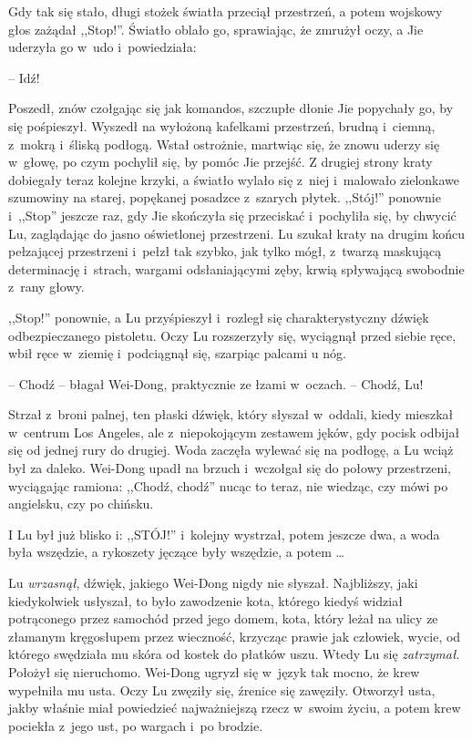 \documentclass[oneside,polish,11pt,rmheadings]{mwbk}
\begin{document}
Gdy tak się stało, długi stożek światła przeciął przestrzeń, a potem wojskowy głos zażądał ,,Stop!''. Światło oblało go, sprawiając, że zmrużył oczy, a Jie uderzyła go w~udo i~powiedziała: 

-- Idź!

Poszedł, znów czołgając się jak komandos, szczupłe dłonie Jie popychały go, by się pośpieszył. Wyszedł na wyłożoną kafelkami przestrzeń, brudną i~ciemną, z~mokrą i~śliską podłogą. Wstał ostrożnie, martwiąc się, że znowu uderzy się w~głowę, po czym pochylił się, by pomóc Jie przejść. Z drugiej strony kraty dobiegały teraz kolejne krzyki, a światło wylało się z~niej i~malowało zielonkawe szumowiny na starej, popękanej posadzce z~szarych płytek. ,,Stój!'' ponownie i~,,Stop'' jeszcze raz, gdy Jie skończyła się przeciskać i~pochyliła się, by chwycić Lu, zaglądając do jasno oświetlonej przestrzeni. Lu szukał kraty na drugim końcu pełzającej przestrzeni i~pełzł tak szybko, jak tylko mógł, z~twarzą maskującą determinację i~strach, wargami odsłaniającymi zęby, krwią spływającą swobodnie z~rany głowy.

,,Stop!'' ponownie, a Lu przyśpieszył i~rozległ się charakterystyczny dźwięk odbezpieczanego pistoletu. Oczy Lu rozszerzyły się, wyciągnął przed siebie ręce, wbił ręce w~ziemię i~podciągnął się, szarpiąc palcami u nóg.

-- Chodź -- błagał Wei-Dong, praktycznie ze łzami w~oczach. -- Chodź, Lu! 

Strzał z~broni palnej, ten płaski dźwięk, który słyszał w~oddali, kiedy mieszkał w~centrum Los Angeles, ale z~niepokojącym zestawem jęków, gdy pocisk odbijał się od jednej rury do drugiej. Woda zaczęła wylewać się na podłogę, a Lu wciąż był za daleko. Wei-Dong upadł na brzuch i~wczołgał się do połowy przestrzeni, wyciągając ramiona: ,,Chodź, chodź'' nucąc to teraz, nie wiedząc, czy mówi po angielsku, czy po chińsku.

I Lu był już blisko i: ,,STÓJ!'' i~kolejny wystrzał, potem jeszcze dwa, a woda była wszędzie, a rykoszety jęczące były wszędzie, a potem \ldots 

Lu \textit{wrzasnął}, dźwięk, jakiego Wei-Dong nigdy nie słyszał. Najbliższy, jaki kiedykolwiek usłyszał, to było zawodzenie kota, którego kiedyś widział potrąconego przez samochód przed jego domem, kota, który leżał na ulicy ze złamanym kręgosłupem przez wieczność, krzycząc prawie jak człowiek, wycie, od którego swędziała mu skóra od kostek do płatków uszu. Wtedy Lu się \textit{zatrzymał}. Położył się nieruchomo. Wei-Dong ugryzł się w~język tak mocno, że krew wypełniła mu usta. Oczy Lu zwęziły się, źrenice się zawęziły. Otworzył usta, jakby właśnie miał powiedzieć najważniejszą rzecz w~swoim życiu, a potem krew pociekła z~jego ust, po wargach i~po brodzie. 
\end{document}
